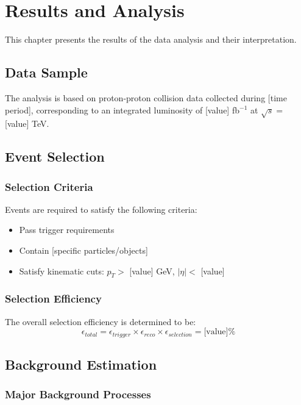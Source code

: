 \chapter{Results and Analysis}
\label{ch:results}

This chapter presents the results of the data analysis and their interpretation.

\section{Data Sample}

The analysis is based on proton-proton collision data collected during [time period], corresponding to an integrated luminosity of [value] fb$^{-1}$ at $\sqrt{s} = $ [value] TeV.

\section{Event Selection}

\subsection{Selection Criteria}

Events are required to satisfy the following criteria:
\begin{itemize}
  \item Pass trigger requirements
  \item Contain [specific particles/objects]
  \item Satisfy kinematic cuts: $p_T > $ [value] GeV, $|\eta| < $ [value]
\end{itemize}

\subsection{Selection Efficiency}

The overall selection efficiency is determined to be:
\begin{equation}
  \epsilon_{total} = \epsilon_{trigger} \times \epsilon_{reco} \times \epsilon_{selection} = \text{[value]}\%
  \label{eq:efficiency}
\end{equation}

\section{Background Estimation}

\subsection{Major Background Processes}

